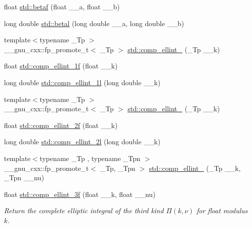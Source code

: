 \begin{DoxyCompactItemize}
\item 
float \hyperlink{group__cxx17__math__spec__func_ga12dc61ee4c09172151cf092ed387e203}{std\+::betaf} (float \+\_\+\+\_\+a, float \+\_\+\+\_\+b)
\item 
long double \hyperlink{group__cxx17__math__spec__func_ga8caca1cef099f41a88111209c36ce06c}{std\+::betal} (long double \+\_\+\+\_\+a, long double \+\_\+\+\_\+b)
\item 
{\footnotesize template$<$typename \+\_\+\+Tp $>$ }\\\+\_\+\+\_\+gnu\+\_\+cxx\+::fp\+\_\+promote\+\_\+t$<$ \+\_\+\+Tp $>$ \hyperlink{group__cxx17__math__spec__func_gad559217fb01e7a8b7a6e23eeedda64be}{std\+::comp\+\_\+ellint\+\_} (\+\_\+\+Tp \+\_\+\+\_\+k)
\item 
float \hyperlink{group__cxx17__math__spec__func_ga7fb5be999a8125cf7e55e630eb8444a1}{std\+::comp\+\_\+ellint\+\_\+1f} (float \+\_\+\+\_\+k)
\item 
long double \hyperlink{group__cxx17__math__spec__func_ga7247d3dd77c1ff5df3c059fed862dc48}{std\+::comp\+\_\+ellint\+\_\+1l} (long double \+\_\+\+\_\+k)
\item 
{\footnotesize template$<$typename \+\_\+\+Tp $>$ }\\\+\_\+\+\_\+gnu\+\_\+cxx\+::fp\+\_\+promote\+\_\+t$<$ \+\_\+\+Tp $>$ \hyperlink{group__cxx17__math__spec__func_gaadf288465eea84ec609d93de96200aaa}{std\+::comp\+\_\+ellint\+\_} (\+\_\+\+Tp \+\_\+\+\_\+k)
\item 
float \hyperlink{group__cxx17__math__spec__func_ga21700f2f125c42b1f1da1f9c7eea1135}{std\+::comp\+\_\+ellint\+\_\+2f} (float \+\_\+\+\_\+k)
\item 
long double \hyperlink{group__cxx17__math__spec__func_ga47b647ec386c8d4b18a030c97842df18}{std\+::comp\+\_\+ellint\+\_\+2l} (long double \+\_\+\+\_\+k)
\item 
{\footnotesize template$<$typename \+\_\+\+Tp , typename \+\_\+\+Tpn $>$ }\\\+\_\+\+\_\+gnu\+\_\+cxx\+::fp\+\_\+promote\+\_\+t$<$ \+\_\+\+Tp, \+\_\+\+Tpn $>$ \hyperlink{group__cxx17__math__spec__func_ga80419d323d3231870bd588525e818974}{std\+::comp\+\_\+ellint\+\_} (\+\_\+\+Tp \+\_\+\+\_\+k, \+\_\+\+Tpn \+\_\+\+\_\+nu)
\item 
float \hyperlink{group__cxx17__math__spec__func_ga76834d3112f777703330892303267a39}{std\+::comp\+\_\+ellint\+\_\+3f} (float \+\_\+\+\_\+k, float \+\_\+\+\_\+nu)
\begin{DoxyCompactList}\small\item\em Return the complete elliptic integral of the third kind $ \Pi(k,\nu) $ for {\ttfamily float} modulus $ k $. \end{DoxyCompactList}\item 

\end{DoxyCompactItemize}
